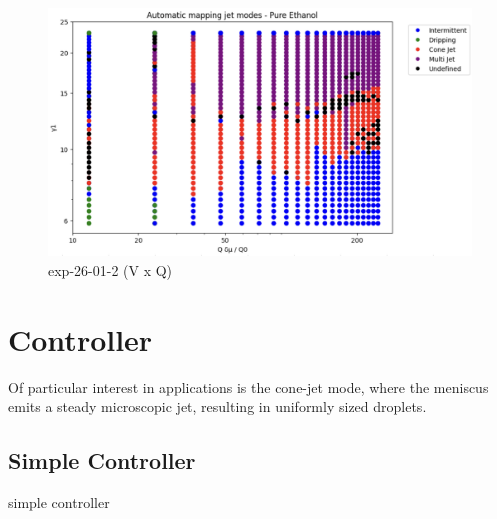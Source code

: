         \begin{figure}[H]
            \center
            \includegraphics[width=12cm]{Figuras/19:03/non-dimensional-1.png}
            \caption{ exp-26-01-2 (V x Q)}
        \end{figure}

\section{Controller}
\label{sec:controller_results}

    Of particular interest in applications is the cone-jet mode, where the meniscus emits a steady microscopic jet, resulting in uniformly sized droplets. 


    \subsection{Simple Controller}

        \begin{algorithm}
            \caption{simple controller}\label{alg:simple_controller}
            \begin{algorithmic}
                
                    \State {}
                    \State {}
                \EndIf

            \EndFunction
            \end{algorithmic}
        \end{algorithm}

